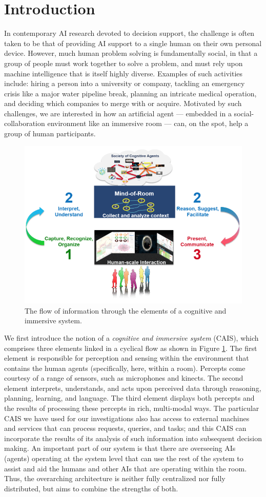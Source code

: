 \section{Introduction}

In contemporary AI research devoted to decision support, the challenge
is often taken to be that of providing AI support to a single human on
their own personal device. However, much human problem solving
is fundamentally social, in that a group of people must work together
to solve a problem, and must rely upon machine intelligence that is
itself highly diverse.  Examples of such activities include: hiring a
person into a university or company, tackling an emergency crisis like
a major water pipeline break, planning an intricate medical operation,
and deciding which companies to merge with or acquire.  Motivated by
such challenges, we are interested in how an artificial agent ---
embedded in a social-collaboration environment like an immersive room
--- can, on the spot, help a group of human participants.

\begin{figure}
\centering
\includegraphics[width=0.5\columnwidth]{chapters/01_introduction/figures/cisl-cycle-graphic.png}
\caption{The flow of information through the elements of a cognitive and immersive system.}
\label{fig:cycle-cais}
\end{figure}

We first introduce the notion of a \emph{cognitive and immersive
  system} (CAIS), which comprises three elements linked in a cyclical
flow as shown in Figure \ref{fig:cycle-cais}.  The first element is
responsible for perception and sensing within the environment that
contains the human agents (specifically, here, within a room).
Percepts come courtesy of a range of sensors, such as microphones and
kinects.  The second element interprets, understands, and acts upon
perceived data through reasoning, planning, learning, and language.
The third element displays both percepts and the results of processing
these percepts in rich, multi-modal ways.  The particular CAIS we have
used for our investigations
also has access to external machines and services that can process
requests, queries, and tasks; and this CAIS can incorporate the
results of its analysis of such information into subsequent decision
making.  An important part of our system is that there are overseeing
AIs (agents) operating at the system level that can use the rest of
the system to assist and aid the humans and other AIs that are
operating within the room.  Thus, the overarching architecture is
neither fully centralized nor fully distributed, but aims to combine
the strengths of both.

